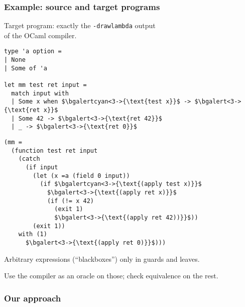 \documentclass[dvipsnames]{beamer}
\begin{document}
\begin{frame}[fragile]
  \frametitle{Example: source and target programs}
  Target program: exactly the \texttt{-drawlambda} output \\ of the OCaml compiler.


\vfill

\begin{small}
  \hspace{-1em}
  \begin{minipage}{0.36\linewidth}
\begin{lstlisting}
type 'a option =
| None
| Some of 'a

let mm test ret input =
  match input with
  | Some x when $\bgalertcyan<3->{\text{test x}}$ -> $\bgalert<3->{\text{ret x}}$
  | Some 42 -> $\bgalert<3->{\text{ret 42}}$
  | _ -> $\bgalert<3->{\text{ret 0}}$
\end{lstlisting}
  \end{minipage}
  \hfill\pause
  \begin{minipage}{0.64\linewidth}
    \begin{lstlisting}
(mm =
  (function test ret input
    (catch
      (if input
        (let (x =a (field 0 input))
          (if $\bgalertcyan<3->{\text{(apply test x)}}$
            $\bgalert<3->{\text{(apply ret x)}}$
            (if (!= x 42)
              (exit 1)
              $\bgalert<3->{\text{(apply ret 42))}}$))
        (exit 1))
    with (1)
      $\bgalert<3->{\text{(apply ret 0)}}$)))
\end{lstlisting}
  \end{minipage}
\end{small}

\pause\vfill
Arbitrary expressions (``blackboxes'') only in guards and leaves.

\pause\vfill

Use the compiler as an oracle on those;
check equivalence on the rest.
\end{frame}

\begin{frame}[fragile]
\frametitle{Our approach}

\vfill
\begin{center}
\end{center}
\vfill

\end{frame}
\end{document}
